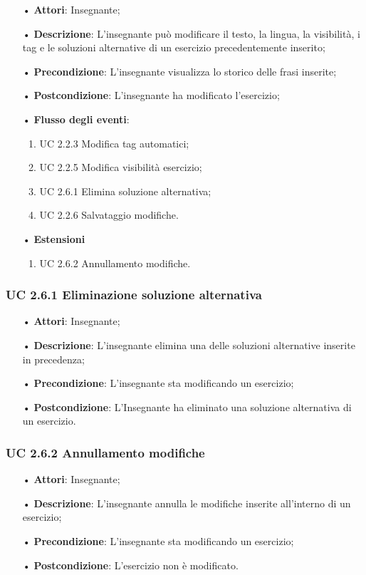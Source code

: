 \begin{itemize}
	\item[•] \textbf{Attori}: Insegnante;
	\item[•] \textbf{Descrizione}: L’insegnante può modificare il testo, la lingua, la visibilità, i tag e le soluzioni alternative di un esercizio precedentemente inserito;
	\item[•] \textbf{Precondizione}: L'insegnante visualizza lo storico delle frasi inserite;
	\item[•] \textbf{Postcondizione}: L’insegnante ha modificato l'esercizio;
	\item[•] \textbf{Flusso degli eventi}:
		\begin{enumerate}
			\item UC 2.2.3 Modifica tag automatici;
			\item UC 2.2.5 Modifica visibilità esercizio;
			\item UC 2.6.1 Elimina soluzione alternativa;
			\item UC 2.2.6 Salvataggio modifiche.
		\end{enumerate}
	\item[•] \textbf{Estensioni}
	\begin{enumerate}
		\item UC 2.6.2 Annullamento modifiche.
	\end{enumerate}
\end{itemize}   

\subsubsection{UC 2.6.1 Eliminazione soluzione alternativa}
\begin{itemize}
	\item[•] \textbf{Attori}: Insegnante;
	\item[•] \textbf{Descrizione}: L'insegnante elimina una delle soluzioni alternative inserite in precedenza;
	\item[•] \textbf{Precondizione}: L'insegnante sta modificando un esercizio;
	\item[•] \textbf{Postcondizione}: L'Insegnante ha eliminato una soluzione alternativa di un esercizio.
\end{itemize}

\subsubsection{UC 2.6.2 Annullamento modifiche}
\begin{itemize}
	\item[•] \textbf{Attori}: Insegnante;
	\item[•] \textbf{Descrizione}: L'insegnante annulla le modifiche inserite all'interno di un esercizio; 
	\item[•] \textbf{Precondizione}: L'insegnante sta modificando un esercizio;
	\item[•] \textbf{Postcondizione}: L'esercizio non è modificato.
\end{itemize}


